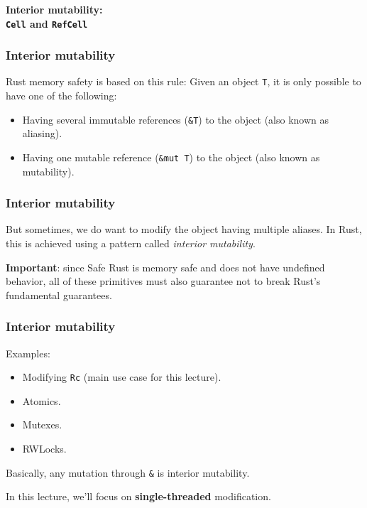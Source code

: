 \documentclass[aspectratio=1610,t]{beamer}
\begin{document}
\begin{frame}[c]
\centering\Huge\textbf{Interior mutability:\\\texttt{Cell} and \texttt{RefCell}}
\end{frame}


\begin{frame}[fragile]
\frametitle{Interior mutability}
Rust memory safety is based on this rule: Given an object \texttt{T}, it is only possible to have one of the following:

\begin{itemize}
    \item Having several immutable references (\texttt{\&T}) to the object (also known as aliasing).
    \item Having one mutable reference (\texttt{\&mut T}) to the object (also known as mutability).
\end{itemize}
\end{frame}


\begin{frame}[fragile]
\frametitle{Interior mutability}
But sometimes, we do want to modify the object having multiple aliases. In Rust, this is achieved using a pattern called \textit{interior mutability}.

\textbf{Important}: since Safe Rust is memory safe and does not have undefined behavior, all of these primitives must also guarantee not to break Rust's fundamental guarantees.
\end{frame}


\begin{frame}[fragile]
\frametitle{Interior mutability}
Examples:

\begin{itemize}
    \item Modifying \texttt{Rc} (main use case for this lecture).
    \item Atomics.
    \item Mutexes.
    \item RWLocks.
\end{itemize}

Basically, any mutation through \texttt{\&} is interior mutability.

In this lecture, we'll focus on \textbf{single-threaded} modification.
\end{frame}
\end{document}

